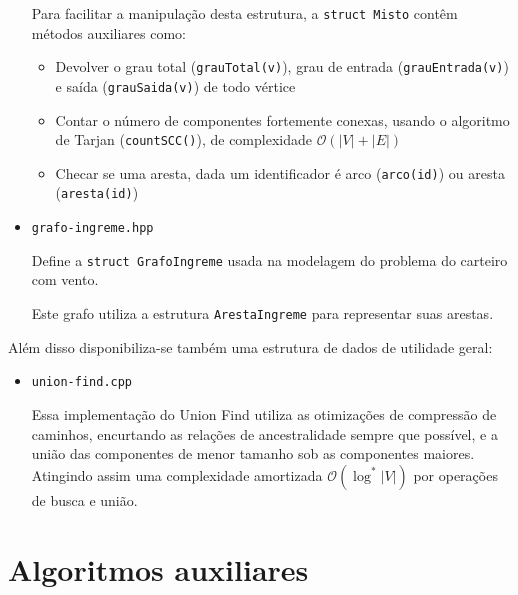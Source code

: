 \begin{itemize}
        Para facilitar a manipulação desta estrutura, a \texttt{struct Misto} contêm métodos auxiliares como:
        \begin{itemize}
            \item  Devolver o grau total (\texttt{grauTotal(v)}), grau de entrada (\texttt{grauEntrada(v)}) e saída (\texttt{grauSaida(v)}) de todo vértice
            \item Contar o número de componentes fortemente conexas, usando o algoritmo de Tarjan (\texttt{countSCC()}), de complexidade $\mathcal{O}(|V| + |E|)$
            \item Checar se uma aresta, dada um identificador é arco (\texttt{arco(id)}) ou aresta (\texttt{aresta(id)})
        \end{itemize}

    \item \texttt{grafo-ingreme.hpp}

    Define a \texttt{struct GrafoIngreme} usada na modelagem do problema do carteiro com vento.

    Este grafo utiliza a estrutura \texttt{ArestaIngreme} para representar suas arestas.

\end{itemize}

Além disso disponibiliza-se também uma estrutura de dados de utilidade geral:

\begin{itemize}
    \item \texttt{union-find.cpp}

        Essa implementação do Union Find utiliza as otimizações de compressão de caminhos, encurtando as relações de ancestralidade sempre que possível, e a união das componentes de menor tamanho sob as componentes maiores.
        Atingindo assim uma complexidade amortizada $\mathcal{O}(\log^*|V|)$ por operações de busca e união.
\end{itemize}

\section{Algoritmos auxiliares}


